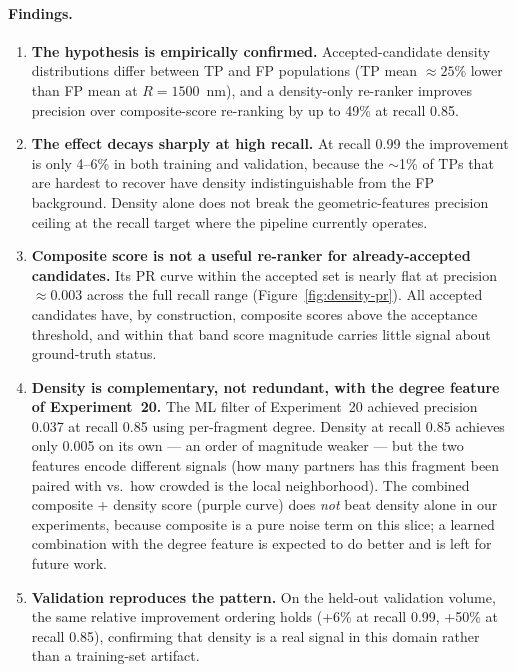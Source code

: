 \paragraph{Findings.}

\begin{enumerate}
  \item \textbf{The hypothesis is empirically confirmed.}  Accepted-candidate
        density distributions differ between TP and FP populations
        (TP mean $\approx 25\%$ lower than FP mean at $R=1500$~nm), and a
        density-only re-ranker improves precision over composite-score
        re-ranking by up to 49\% at recall 0.85.

  \item \textbf{The effect decays sharply at high recall.}  At recall 0.99
        the improvement is only 4--6\% in both training and validation,
        because the $\sim$1\% of TPs that are hardest to recover have density
        indistinguishable from the FP background.  Density alone does not
        break the geometric-features precision ceiling at the recall target
        where the pipeline currently operates.

  \item \textbf{Composite score is not a useful re-ranker for already-accepted
        candidates.}  Its PR curve within the accepted set is nearly flat at
        precision $\approx 0.003$ across the full recall range
        (Figure~\ref{fig:density-pr}).  All accepted candidates have, by
        construction, composite scores above the acceptance threshold, and
        within that band score magnitude carries little signal about
        ground-truth status.

  \item \textbf{Density is complementary, not redundant, with the degree
        feature of Experiment~20.}  The ML filter of Experiment~20 achieved
        precision 0.037 at recall 0.85 using per-fragment degree.  Density
        at recall 0.85 achieves only 0.005 on its own --- an order of
        magnitude weaker --- but the two features encode different signals
        (how many partners has this fragment been paired with vs.\ how
        crowded is the local neighborhood).  The combined composite + density
        score (purple curve) does \emph{not} beat density alone in our
        experiments, because composite is a pure noise term on this slice;
        a learned combination with the degree feature is expected to do
        better and is left for future work.

  \item \textbf{Validation reproduces the pattern.}  On the held-out
        validation volume, the same relative improvement ordering holds
        (+6\% at recall 0.99, +50\% at recall 0.85), confirming that
        density is a real signal in this domain rather than a
        training-set artifact.
\end{enumerate}


